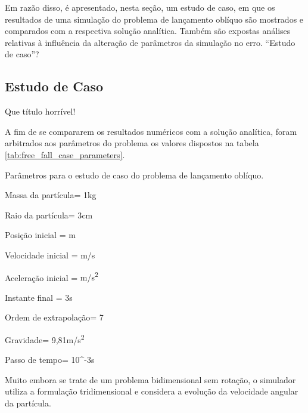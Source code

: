 Em razão disso, é apresentado, nesta seção, um estudo de caso, em que os resultados de uma simulação do problema de lançamento oblíquo são mostrados e comparados com a respectiva solução analítica. Também são expostas análises relativas à influência da alteração de parâmetros da simulação no erro.
\alert{``Estudo de caso''?}

\subsection{Estudo de Caso} \alert{Que título horrível!}

A fim de se compararem os resultados numéricos com a solução analítica, foram arbitrados aos parâmetros do problema os valores dispostos na tabela \ref{tab:free_fall_case_parameters}.

\begin{table}[h]
\centering
\caption{Parâmetros para o \alert{estudo de caso} do problema de lançamento oblíquo.}
\label{tab:free_fall_case_parameters}
\begin{parametersdesc}
	\item{Massa da partícula}{\mass = 1}{\si\kilogram}
	\item{Raio da partícula}{\radius = 3}{\si\centi\metre}
	\item{Posição inicial}{\explicitVector{\initial{\positionx}}{\initial{\positiony}}{\initial{\positionz}} = }{\si{\metre}}
	\item{Velocidade inicial}{\explicitVector{\initial{\velocityx}}{\initial{\velocityy}}{\initial{\velocityz}} = }{\si[per-mode=symbol]{\metre\per\second}}
	\item{Aceleração inicial}{\explicitVector{\initial{\accelerationx}}{\initial{\accelerationy}}{\initial{\accelerationz}} = }{\si[per-mode=symbol]{\metre\per\square\second}}
	\item{Instante final}{ = 3}{\si\second} 
	\item{Ordem de extrapolação}{\taylorOrder = 7}{\emptyTableEntry}
	\item{Gravidade}{\gravityScalar = 9,81}{\si[per-mode=symbol]{\metre\per\square\second}}
	\item{Passo de tempo}{\Dt = 10^{-3}}{\si\second}
\end{parametersdesc}
\sourceMe 
\end{table}

Muito embora se trate de um problema bidimensional sem rotação, o simulador utiliza a formulação tridimensional e considera a evolução da velocidade angular da partícula.

